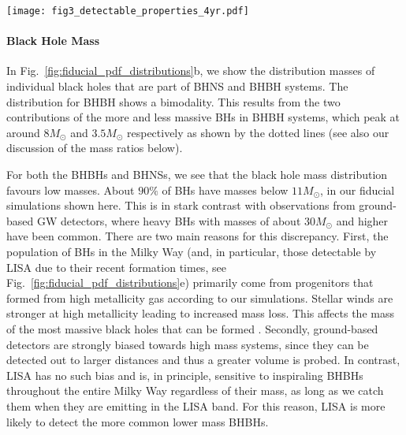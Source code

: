 \begin{figure*}[t]
    \centering
    \texttt{[image: fig3\_detectable\_properties\_4yr.pdf]}
    \caption{Properties of detectable systems for a 4-year LISA mission in our fiducial model. Each panel shows a kernel density estimator for a single property, coloured by DCO type. Each curve has been individually normalised. The shaded areas show the 1- and 2-$\sigma$ sampling uncertainties (obtained via bootstrapping). The dotted lines in panel b show the individual primary and secondary mass distributions. The dotted line in panel e shows the star formation history we have assumed in our Milky Way model. See Sec.~\ref{sec:fiducial_distributions} for a discussion. \href{https://github.com/TomWagg/detecting-DCOs-in-LISA/blob/main/paper/figures/fig3_detectable_properties_4yr.pdf}{\faFileImage} \href{https://github.com/TomWagg/detecting-DCOs-in-LISA/blob/main/paper/figure_notebooks/fiducial.ipynb}{\faBook}.}
    \label{fig:fiducial_pdf_distributions}
\end{figure*}

\paragraph{Black Hole Mass}
In Fig.~\ref{fig:fiducial_pdf_distributions}b, we show the distribution masses of individual black holes that are part of BHNS and BHBH systems. 
The distribution for BHBH shows a bimodality. This results from the two contributions of the more and less massive BHs in BHBH systems, which peak at around $8 \unit{M_{\odot}}$ and $3.5 \unit{M_{\odot}}$ respectively as shown by the dotted lines (see also our discussion of the mass ratios below).

For both the BHBHs and BHNSs, we see that the black hole mass distribution favours low masses. About $90\%$ of BHs have masses below $11 \unit{M_{\odot}}$, in our fiducial simulations shown here. This is in stark contrast with observations from ground-based GW detectors, where heavy BHs with masses of about $30\unit{M_{\odot}}$ and higher have been common. There are two main reasons for this discrepancy. First, the population of BHs in the Milky Way (and, in particular, those detectable by LISA due to their recent formation times, see Fig.~\ref{fig:fiducial_pdf_distributions}e) primarily come from progenitors that formed from high metallicity gas according to our simulations. Stellar winds are stronger at high metallicity leading to increased mass loss. This affects the mass of the most massive black holes that can be formed \citep{Belczynski+2010}. Secondly, ground-based detectors are strongly biased towards high mass systems, since they can be detected out to larger distances and thus a greater volume is probed. In contrast, LISA has no such bias and is, in principle, sensitive to inspiraling BHBHs throughout the entire Milky Way regardless of their mass, as long as we catch them when they are emitting in the LISA band. For this reason, LISA is more likely to detect the more common lower mass BHBHs. 

